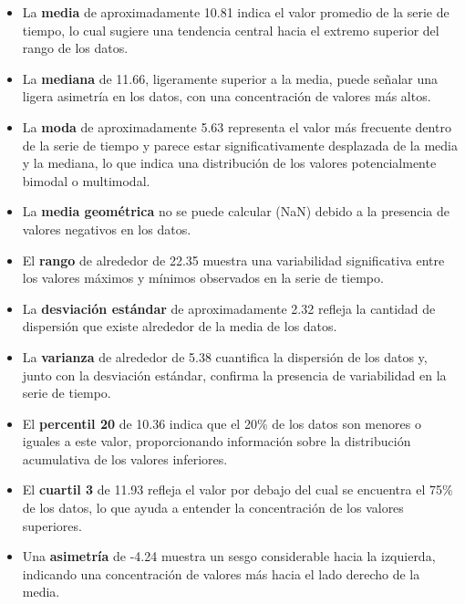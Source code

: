 \documentclass[11pt]{article} %
\begin{document}
	\begin{itemize}
		\item La \textbf{media} de aproximadamente 10.81 indica el valor promedio de la serie de tiempo, lo cual sugiere una tendencia central hacia el extremo superior del rango de los datos.
		
		\item La \textbf{mediana} de 11.66, ligeramente superior a la media, puede señalar una ligera asimetría en los datos, con una concentración de valores más altos.
		
		\item La \textbf{moda} de aproximadamente 5.63 representa el valor más frecuente dentro de la serie de tiempo y parece estar significativamente desplazada de la media y la mediana, lo que indica una distribución de los valores potencialmente bimodal o multimodal.
		
		\item La \textbf{media geométrica} no se puede calcular (NaN) debido a la presencia de valores negativos en los datos.
		
		\item El \textbf{rango} de alrededor de 22.35 muestra una variabilidad significativa entre los valores máximos y mínimos observados en la serie de tiempo.
		
		\item La \textbf{desviación estándar} de aproximadamente 2.32 refleja la cantidad de dispersión que existe alrededor de la media de los datos.
		
		\item La \textbf{varianza} de alrededor de 5.38 cuantifica la dispersión de los datos y, junto con la desviación estándar, confirma la presencia de variabilidad en la serie de tiempo.
		
		\item El \textbf{percentil 20} de 10.36 indica que el 20\% de los datos son menores o iguales a este valor, proporcionando información sobre la distribución acumulativa de los valores inferiores.
		
		\item El \textbf{cuartil 3} de 11.93 refleja el valor por debajo del cual se encuentra el 75\% de los datos, lo que ayuda a entender la concentración de los valores superiores.
		
		\item Una \textbf{asimetría} de -4.24 muestra un sesgo considerable hacia la izquierda, indicando una concentración de valores más hacia el lado derecho de la media.
		

\end{itemize}
\end{document}
